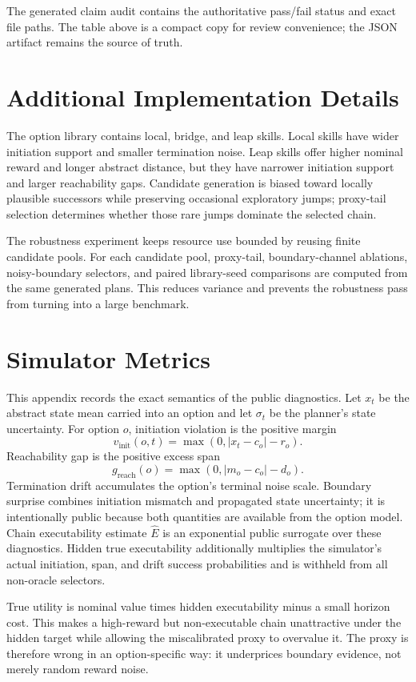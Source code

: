 \documentclass{article}
\begin{document}
The generated claim audit contains the authoritative pass/fail status and exact file paths. The table above is a compact copy for review convenience; the JSON artifact remains the source of truth.

\section{Additional Implementation Details}

The option library contains local, bridge, and leap skills. Local skills have wider initiation support and smaller termination noise. Leap skills offer higher nominal reward and longer abstract distance, but they have narrower initiation support and larger reachability gaps. Candidate generation is biased toward locally plausible successors while preserving occasional exploratory jumps; proxy-tail selection determines whether those rare jumps dominate the selected chain.

The robustness experiment keeps resource use bounded by reusing finite candidate pools. For each candidate pool, proxy-tail, boundary-channel ablations, noisy-boundary selectors, and paired library-seed comparisons are computed from the same generated plans. This reduces variance and prevents the robustness pass from turning into a large benchmark.

\section{Simulator Metrics}

This appendix records the exact semantics of the public diagnostics. Let \(x_t\) be the abstract state mean carried into an option and let \(\sigma_t\) be the planner's state uncertainty. For option \(o\), initiation violation is the positive margin
\[
v_{\mathrm{init}}(o,t)=\max(0, |x_t-c_o|-r_o).
\]
Reachability gap is the positive excess span
\[
g_{\mathrm{reach}}(o)=\max(0, |m_o-c_o|-d_o).
\]
Termination drift accumulates the option's terminal noise scale. Boundary surprise combines initiation mismatch and propagated state uncertainty; it is intentionally public because both quantities are available from the option model. Chain executability estimate \(\widehat E\) is an exponential public surrogate over these diagnostics. Hidden true executability additionally multiplies the simulator's actual initiation, span, and drift success probabilities and is withheld from all non-oracle selectors.

True utility is nominal value times hidden executability minus a small horizon cost. This makes a high-reward but non-executable chain unattractive under the hidden target while allowing the miscalibrated proxy to overvalue it. The proxy is therefore wrong in an option-specific way: it underprices boundary evidence, not merely random reward noise.
\end{document}
